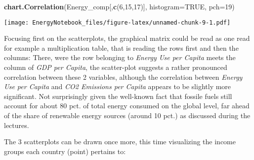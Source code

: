 \documentclass[]{article}
\newenvironment{Shaded}{\begin{snugshade}}{\end{snugshade}}
\newcommand{\KeywordTok}[1]{\textcolor[rgb]{0.13,0.29,0.53}{\textbf{#1}}}
\newcommand{\DataTypeTok}[1]{\textcolor[rgb]{0.13,0.29,0.53}{#1}}
\newcommand{\DecValTok}[1]{\textcolor[rgb]{0.00,0.00,0.81}{#1}}
\newcommand{\FloatTok}[1]{\textcolor[rgb]{0.00,0.00,0.81}{#1}}
\newcommand{\StringTok}[1]{\textcolor[rgb]{0.31,0.60,0.02}{#1}}
\newcommand{\OtherTok}[1]{\textcolor[rgb]{0.56,0.35,0.01}{#1}}
\newcommand{\ControlFlowTok}[1]{\textcolor[rgb]{0.13,0.29,0.53}{\textbf{#1}}}
\newcommand{\OperatorTok}[1]{\textcolor[rgb]{0.81,0.36,0.00}{\textbf{#1}}}
\newcommand{\NormalTok}[1]{#1}
\begin{document}
\begin{Shaded}
\begin{Highlighting}[]
\KeywordTok{chart.Correlation}\NormalTok{(Energy_comp[,}\KeywordTok{c}\NormalTok{(}\DecValTok{6}\NormalTok{,}\DecValTok{15}\NormalTok{,}\DecValTok{17}\NormalTok{)], }\DataTypeTok{histogram=}\OtherTok{TRUE}\NormalTok{, }\DataTypeTok{pch=}\DecValTok{19}\NormalTok{)}
\end{Highlighting}
\end{Shaded}

\texttt{[image: EnergyNotebook\_files/figure-latex/unnamed-chunk-9-1.pdf]}

Focusing first on the scatterplots, the graphical matrix could be read
as one read for example a multiplication table, that is reading the rows
first and then the columns: There, were the row belonging to
\emph{Energy Use per Capita} meets the column of \emph{GDP per Capita},
the scatter-plot suggests a rather pronounced correlation between these
2 variables, although the correlation between \emph{Energy Use per
Capita} and \emph{CO2 Emissions per Capita} appears to be slightly more
significant. Not surprisingly given the well-known fact that fossile
fuels still account for about 80 pct. of total energy consumed on the
global level, far ahead of the share of renewable energy sources (around
10 pct.) as discussed during the lectures.

The 3 scatterplots can be drawn once more, this time visualizing the
income groups each country (point) pertains to:

\begin{Shaded}
\end{Shaded}
\end{document}
